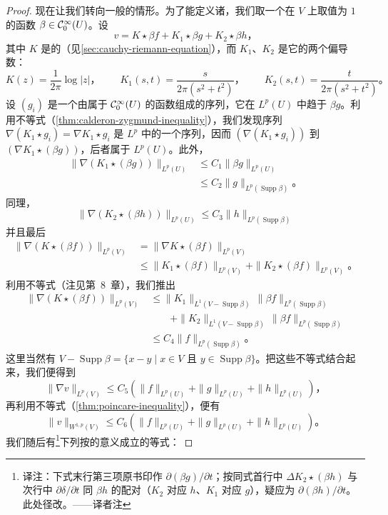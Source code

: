 \begin{proof}
现在让我们转向一般的情形。为了能定义诸\trConvolution，我们取一个在 $V$ 上取值为 $1$ 的函数 $\beta\in\mathcal{C}^{\infty}_{0}(U)$。设
\[
v=K\star\beta f+K_{1}\star\beta g+K_{2}\star\beta h\text{，}
\]
其中 $K$ 是\trLaplacian{}的\trFundamentalSolution（见\cref{sec:cauchy-riemann-equation}），而 $K_{1}$、$K_{2}$ 是它的两个偏导数：
\[
K(z)=\frac{1}{2\pi}\log|z|\text{，}\qquad K_{1}(s,t)=\frac{s}{2\pi(s^{2}+t^{2})}\text{，}\qquad K_{2}(s,t)=\frac{t}{2\pi(s^{2}+t^{2})}\text{。}
\]
设 $(g_{i})$ 是一个由属于 $\mathcal{C}^{\infty}_{0}(U)$ 的函数组成的序列，它在 $L^{p}(U)$ 中趋于 $\beta g$。利用\trCalderonZygmund{}不等式（\cref{thm:calderon-zygmund-inequality}），我们发现序列 $\nabla(K_{1}\star g_{i})=\nabla K_{1}\star g_{i}$ 是 $L^{p}$ 中的一个\trCauchy{}序列，因而 $(\nabla(K_{1}\star g_{i}))$ \trConvergence{}到 $(\nabla K_{1}\star(\beta g))$，后者属于 $L^{p}(U)$。此外，
\[
\begin{aligned}
\|\nabla(K_{1}\star(\beta g))\|_{L^{p}(U)}&\le C_{1}\|\beta g\|_{L^{p}(U)}\\
&\le C_{2}\|g\|_{L^{p}(\operatorname{Supp}\beta)}\text{。}
\end{aligned}
\]
同理，
\[
\|\nabla(K_{2}\star(\beta h))\|_{L^{p}(U)}\le C_{3}\|h\|_{L^{p}(\operatorname{Supp}\beta)}
\]
并且最后
\[
\begin{aligned}
\|\nabla(K\star(\beta f))\|_{L^{p}(V)}&=\|\nabla K\star(\beta f)\|_{L^{p}(V)}\\
&\le\|K_{1}\star(\beta f)\|_{L^{p}(V)}+\|K_{2}\star(\beta f)\|_{L^{p}(V)}\text{。}
\end{aligned}
\]
利用\trYoung{}不等式（注见第~8~章），我们推出
\[
\begin{aligned}
\|\nabla(K\star(\beta f))\|_{L^{p}(V)}&\le\|K_{1}\|_{L^{1}(V-\operatorname{Supp}\beta)}\,\|\beta f\|_{L^{p}(\operatorname{Supp}\beta)}\\
&\qquad+\|K_{2}\|_{L^{1}(V-\operatorname{Supp}\beta)}\,\|\beta f\|_{L^{p}(\operatorname{Supp}\beta)}\\
&\le C_{4}\|f\|_{L^{p}(\operatorname{Supp}\beta)}\text{。}
\end{aligned}
\]
这里当然有 $V-\operatorname{Supp}\beta=\{x-y\mid x\in V\text{ 且 }y\in\operatorname{Supp}\beta\}$。把这些不等式结合起来，我们便得到
\[
\|\nabla v\|_{L^{p}(V)}\le C_{5}\left(\|f\|_{L^{p}(U)}+\|g\|_{L^{p}(U)}+\|h\|_{L^{p}(U)}\right)\text{，}
\]
再利用\trPoincare{}不等式（\cref{thm:poincare-inequality}），便有
\[
\|v\|_{W^{1,p}(V)}\le C_{6}\left(\|f\|_{L^{p}(U)}+\|g\|_{L^{p}(U)}+\|h\|_{L^{p}(U)}\right)\text{。}
\]
我们随后有\footnote{译注：下式末行第三项原书印作 $\partial(\beta g)/\partial t$；按同式首行中 $\Delta K_{2}\star(\beta h)$ 与次行中 $\partial\delta/\partial t$ 同 $\beta h$ 的配对（$K_{2}$ 对应 $h$、$K_{1}$ 对应 $g$），疑应为 $\partial(\beta h)/\partial t$。此处径改。——译者注}下列按\trDistribution{}的意义成立的等式：

\end{proof}
